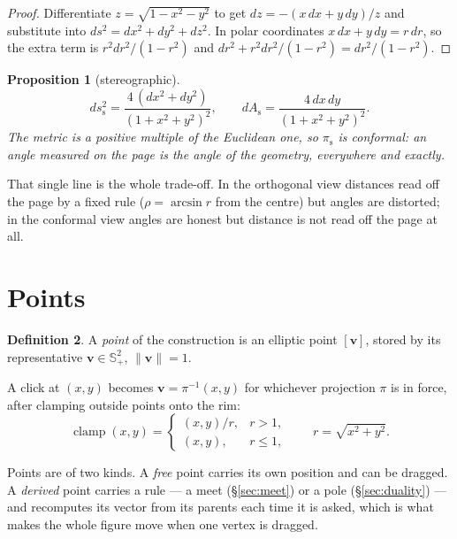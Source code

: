 \documentclass[11pt,a4paper]{article}
\newcommand{\Hemi}{\mathbb{S}^{2}_{+}}
\newcommand{\proj}[1]{\pi_{\mathrm{#1}}}
\newcommand{\ps}{\proj{s}}
\newcommand{\vv}{\mathbf{v}}
\newcommand{\norm}[1]{\lVert #1 \rVert}
\theoremstyle{plain}
\newtheorem{proposition}{Proposition}[section]
\theoremstyle{definition}
\newtheorem{definition}[proposition]{Definition}
\theoremstyle{remark}
\begin{document}
\begin{proof}
Differentiate $z=\sqrt{1-x^2-y^2}$ to get $dz=-(x\,dx+y\,dy)/z$ and substitute
into $ds^2=dx^2+dy^2+dz^2$. In polar coordinates $x\,dx+y\,dy=r\,dr$, so the
extra term is $r^2dr^2/(1-r^2)$ and $dr^2+r^2dr^2/(1-r^2)=dr^2/(1-r^2)$.
\end{proof}

\begin{proposition}[stereographic]
\begin{equation}
  ds_{\mathrm{s}}^2=\frac{4\,(dx^2+dy^2)}{(1+x^2+y^2)^2},
  \qquad
  dA_{\mathrm{s}}=\frac{4\,dx\,dy}{(1+x^2+y^2)^2}.
\end{equation}
The metric is a positive multiple of the Euclidean one, so $\ps$ is
\emph{conformal}: an angle measured on the page is the angle of the geometry,
everywhere and exactly.
\end{proposition}

That single line is the whole trade-off. In the orthogonal view distances read
off the page by a fixed rule ($\rho=\arcsin r$ from the centre) but angles are
distorted; in the conformal view angles are honest but distance is not read off
the page at all.

\section{Points}

\begin{definition}
A \emph{point} of the construction is an elliptic point $[\vv]$, stored by its
representative $\vv\in\Hemi$, $\norm{\vv}=1$.
\end{definition}

A click at $(x,y)$ becomes $\vv=\pi^{-1}(x,y)$ for whichever projection $\pi$ is
in force, after clamping outside points onto the rim:
\begin{equation}
  \operatorname{clamp}(x,y)=
  \begin{cases}
    (x,y)/r, & r>1,\\
    (x,y), & r\le1,
  \end{cases}
  \qquad r=\sqrt{x^2+y^2}.
\end{equation}

Points are of two kinds. A \emph{free} point carries its own position and can be
dragged. A \emph{derived} point carries a rule --- a meet (\S\ref{sec:meet}) or a
pole (\S\ref{sec:duality}) --- and recomputes its vector from its parents each
time it is asked, which is what makes the whole figure move when one vertex is
dragged.
\end{document}
